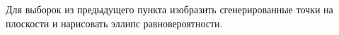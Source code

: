 Для выборок из предыдущего пункта изобразить сгенерированные точки на плоскости и нарисовать эллипс равновероятности.
